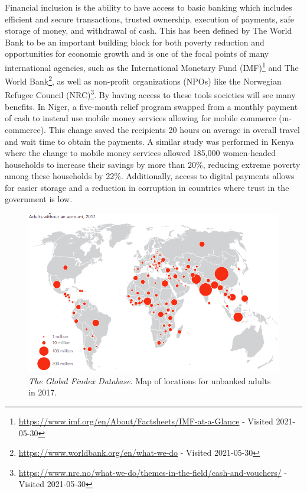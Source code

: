 \documentclass[11pt, a4paper]{article}
\begin{document}
Financial inclusion is the ability to have access to basic banking which includes efficient and secure transactions, trusted ownership, execution of payments, safe storage of money, and withdrawal of cash. This has been defined by The World Bank to be an important building block for both poverty reduction and opportunities for economic growth\cite{gfindex} and is one of the focal points of many international agencies, such as the International Monetary Fund (IMF)\footnote{\url{https://www.imf.org/en/About/Factsheets/IMF-at-a-Glance} - Visited 2021-05-30} and The World Bank\footnote{\url{https://www.worldbank.org/en/what-we-do} - Visited 2021-05-30}, as well as non-profit organizations (NPOs) like the Norwegian Refugee Council (NRC)\footnote{\url{https://www.nrc.no/what-we-do/themes-in-the-field/cash-and-vouchers/} - Visited 2021-05-30}. By having access to these tools societies will see many benefits. In Niger, a five-month relief program swapped from a monthly payment of cash to instead use mobile money services allowing for mobile commerce (m-commerce). This change saved the recipients 20 hours on average in overall travel and wait time to obtain the payments\cite{gfindex}. A similar study was performed in Kenya where the change to mobile money services allowed 185,000 women-headed households to increase their savings by more than 20\%, reducing extreme poverty among these households by 22\%\cite{gfindex}. Additionally, access to digital payments allows for easier storage and a reduction in corruption in countries where trust in the government is low\cite{gfindex}.

\begin{figure}[ht]
\centering
\includegraphics[width=1\linewidth]{figs/unbanked_map}
\caption{\textit{The Global Findex Database\cite{gfindex}}. Map of locations for unbanked adults in 2017.}
\label{fig: unbanked_map}
\end{figure}
\end{document}
